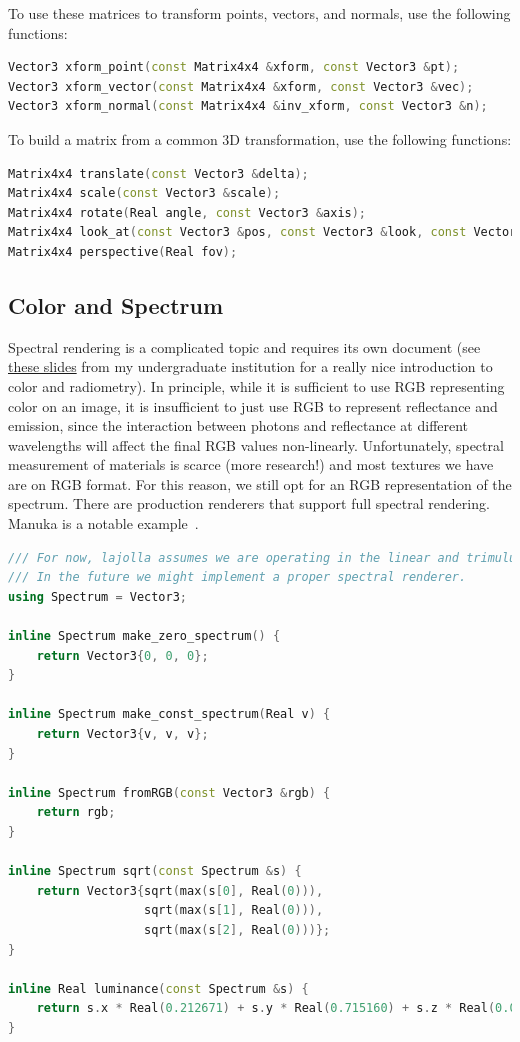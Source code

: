 To use these matrices to transform points, vectors, and normals, use the following functions:
\begin{lstlisting}[language=c++]
Vector3 xform_point(const Matrix4x4 &xform, const Vector3 &pt);
Vector3 xform_vector(const Matrix4x4 &xform, const Vector3 &vec);
Vector3 xform_normal(const Matrix4x4 &inv_xform, const Vector3 &n);
\end{lstlisting}

To build a matrix from a common 3D transformation, use the following functions:
\begin{lstlisting}[language=c++]
Matrix4x4 translate(const Vector3 &delta);
Matrix4x4 scale(const Vector3 &scale);
Matrix4x4 rotate(Real angle, const Vector3 &axis);
Matrix4x4 look_at(const Vector3 &pos, const Vector3 &look, const Vector3 &up);
Matrix4x4 perspective(Real fov);
\end{lstlisting}

\subsection{Color and Spectrum}
Spectral rendering is a complicated topic and requires its own document (see \href{https://www.csie.ntu.edu.tw/~cyy/courses/rendering/16fall/lectures/handouts/chap05_color_radiometry.pdf}{these slides} from my undergraduate institution for a really nice introduction to color and radiometry). In principle, while
it is sufficient to use RGB representing color on an image, it is insufficient to just use RGB
to represent reflectance and emission, since the interaction between photons and reflectance at different
wavelengths will affect the final RGB values non-linearly. Unfortunately, spectral measurement of materials is scarce (more research!) and most textures we have are on RGB format. For this reason, we still opt for an RGB representation
of the spectrum. There are production renderers that support full spectral rendering. Manuka is a notable example~\cite{Fascione:2018:MBA}.

\begin{lstlisting}[language=c++]
/// For now, lajolla assumes we are operating in the linear and trimulus RGB color space.
/// In the future we might implement a proper spectral renderer.
using Spectrum = Vector3;

inline Spectrum make_zero_spectrum() {
    return Vector3{0, 0, 0};
}

inline Spectrum make_const_spectrum(Real v) {
    return Vector3{v, v, v};
}

inline Spectrum fromRGB(const Vector3 &rgb) {
    return rgb;
}

inline Spectrum sqrt(const Spectrum &s) {
    return Vector3{sqrt(max(s[0], Real(0))),
                   sqrt(max(s[1], Real(0))),
                   sqrt(max(s[2], Real(0)))};
}

inline Real luminance(const Spectrum &s) {
    return s.x * Real(0.212671) + s.y * Real(0.715160) + s.z * Real(0.072169);
}
\end{lstlisting}

